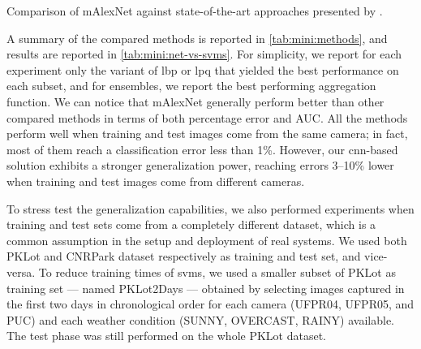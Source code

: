 \begin{table}
	\caption{Comparison of mAlexNet against state-of-the-art approaches presented by \citet{de2015pklot}.}
	\label{tab:mini:net-vs-svms}
\end{table}

A summary of the compared methods is reported in \ref{tab:mini:methods}, and results are reported in \ref{tab:mini:net-vs-svms}.
For simplicity, we report for each experiment only the variant of \gls{lbp} or \gls{lpq} that yielded the best performance on each subset, and for ensembles, we report the best performing aggregation function.
We can notice that mAlexNet generally perform better than other compared methods in terms of both percentage error and AUC.
All the methods perform well when training and test images come from the same camera;
in fact, most of them reach a classification error less than 1\%.
However, our \gls{cnn}-based solution exhibits a stronger generalization power, reaching errors 3--10\% lower when training and test images come from different cameras.

To stress test the generalization capabilities, we also performed experiments when training and test sets come from a completely different dataset, which is a common assumption in the setup and deployment of real systems.
We used both PKLot and CNRPark dataset respectively as training and test set, and vice-versa.
To reduce training times of \glspl{svm}, we used a smaller subset of PKLot as training set --- named PKLot2Days --- obtained by selecting images captured in the first two days in chronological order for each camera (UFPR04, UFPR05, and PUC) and each weather condition (SUNNY, OVERCAST, RAINY) available.
The test phase was still performed on the whole PKLot dataset.

